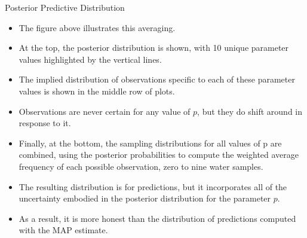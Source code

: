 \documentclass[handout]{beamer}
\begin{document}
\begin{frame}{Posterior Predictive Distribution}
\scriptsize{

\begin{itemize}

\item  The figure above illustrates this averaging. 

\item At the top, the posterior distribution is shown, with 10 unique parameter values highlighted by the vertical lines. 

\item The implied distribution of observations specific to each of these parameter values is shown in the middle row of plots. 

\item Observations are never certain for any value of $p$, but they do shift around in response to it. 

\item Finally, at the bottom, the sampling distributions for all values of p are combined, using the posterior probabilities to compute the weighted average frequency of each possible observation, zero to nine water samples.

\item The resulting distribution is for predictions, but it incorporates all of the uncertainty embodied in the posterior distribution for the parameter $p$. 

\item As a result, it is more honest than the distribution of predictions computed with the MAP estimate.



\end{itemize}


} 
\end{frame}
\end{document}
